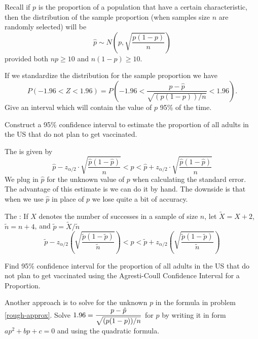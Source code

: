 \clearpage

\bbox
Recall if $p$ is the proportion of a population that have a certain characteristic, then the distribution of the sample proportion (when samples size $n$ are randomly selected) will be
\[ \hat{p} \sim N \left( p, \sqrt{ \frac{p(1-p)}{n}} \right) \]
provided both $np \geq 10$ and $n(1-p) \geq 10$.
\ebox


\bb
\ii If we standardize the distribution for the sample proportion we have
\[ P \left( -1.96 < Z < 1.96 \right) = P \left( -1.96 < \frac{p - \hat{p}}{\sqrt{(p(1-p))/n}} < 1.96 \right).\]
Give an interval which will contain the value of $p$ 95\% of the time.\label{rough-approx}


\vfill

\ii Construct a 95\% confidence interval to estimate the proportion of all adults in the US that do not plan to get vaccinated.

\ee
\vfill


\clearpage

\bbox
The \textbf{} is given by
\[ \hat{p} - z_{\alpha/2} \cdot \sqrt{ \frac{\hat{p}(1-\hat{p})}{n}}  < p <  \hat{p} + z_{\alpha/2} \cdot \sqrt{ \frac{\hat{p}(1-\hat{p})}{n}} \] 
We plug in $\hat{p}$ for the unknown value of $p$ when calculating the standard error.
\bi
\ii The advantage of this estimate is we can do it by hand.
\ii The downside is that when we use $\hat{p}$ in place of $p$ we lose quite a bit of accuracy.
\ei
\ebox


\bbox
The \textbf{}: If $X$ denotes the number of successes in a sample of size $n$, let $\tilde{X} = X+2$, $\tilde{n}=n+4$, and $\tilde{p} = \tilde{X}/\tilde{n}$
\[ \tilde{p} - z_{\alpha/2} \left( \sqrt{ \frac{\tilde{p}(1-\tilde{p})}{\tilde{n}}} \right) < p <  \tilde{p} + z_{\alpha/2} \left( \sqrt{ \frac{\tilde{p}(1-\tilde{p})}{\tilde{n}}} \right)\] 
\ebox

\bb[resume]
\ii Find 95\% confidence interval for the proportion of all adults in the US that do not plan to get vaccinated using the Agresti-Coull Confidence Interval for a Proportion.


\vspace{1in}

\ii Another approach is to solve for the unknown $p$ in the formula in problem \ref{rough-approx}.  Solve $\displaystyle 1.96 =  \frac{p - \hat{p}}{\sqrt{(p(1-p))/n}}$ for $p$ by writing it in form $ap^2+bp+c=0$ and using the quadratic formula. \vfill
\ee

